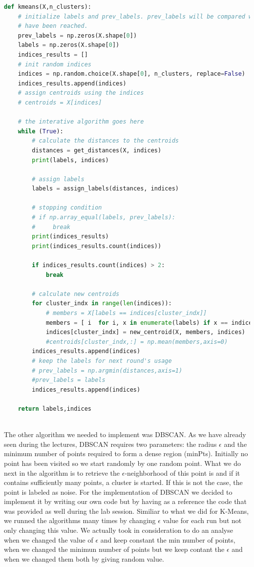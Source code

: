 \documentclass{article}
\begin{document}
\begin{lstlisting}[language=Python, caption= K-Means Algorithm, label={lst:K-Means implementation}]
def kmeans(X,n_clusters):
    # initialize labels and prev_labels. prev_labels will be compared with labels to check if the stopping condition
    # have been reached.
    prev_labels = np.zeros(X.shape[0])
    labels = np.zeros(X.shape[0])
    indices_results = []
    # init random indices
    indices = np.random.choice(X.shape[0], n_clusters, replace=False)
    indices_results.append(indices)
    # assign centroids using the indices
    # centroids = X[indices]
    
    # the interative algorithm goes here
    while (True):
        # calculate the distances to the centroids
        distances = get_distances(X, indices)
        print(labels, indices)

        # assign labels
        labels = assign_labels(distances, indices)
        
        # stopping condition
        # if np.array_equal(labels, prev_labels):
        #     break
        print(indices_results)
        print(indices_results.count(indices))

        if indices_results.count(indices) > 2:
            break
        
        # calculate new centroids
        for cluster_indx in range(len(indices)):
            # members = X[labels == indices[cluster_indx]]
            members = [ i  for i, x in enumerate(labels) if x == indices[cluster_indx]]
            indices[cluster_indx] = new_centroid(X, members, indices)
            #centroids[cluster_indx,:] = np.mean(members,axis=0)
        indices_results.append(indices)
        # keep the labels for next round's usage
        # prev_labels = np.argmin(distances,axis=1)
        #prev_labels = labels
        indices_results.append(indices)
    
    return labels,indices
    
            \end{lstlisting}
            
The other algorithm we needed to implement was DBSCAN. As we have already seen during the lectures, DBSCAN requires two parameters: the
radius $\epsilon$ and the minimum number of points required to form a dense region (minPts). Initially no point has been visited so we start randomly by one random point. What we do next in the algorithm is to retrieve the $\epsilon$-neighborhood of this point is and if it contains sufficiently many points, a cluster is started. If this is not the case, the point is labeled as noise. For the implementation of DBSCAN we decided to implement it by writing our own code but by having as a reference the code that was provided as well during the lab session. Similiar to what we did for K-Means, we runned the algorithms many times by changing $\epsilon$ value for each run but not only changing this value. We actually took in consideration to do an analyse when we changed the value of $\epsilon$ and keep constant the min number of points, when we changed the minimun number of points but we keep contant the $\epsilon$ and when we changed them both by giving random value. 
\end{document}
